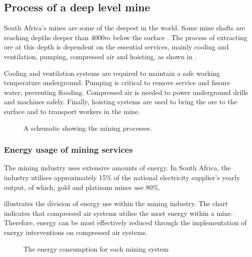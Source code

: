 	\subsection{Process of a deep level mine}
	South Africa's mines are some of the deepest in the world. Some mine shafts are reaching depths deeper than $4000m$ below the surface \cite{vosloo2012case}. The process of extracting ore at this depth is dependent on the essential services, mainly cooling and ventilation, pumping, compressed air and hoisting, as shown in .
	\par 
	 Cooling and ventilation systems are required to maintain a safe working temperature underground. Pumping is critical to remove service and fissure water, preventing flooding. Compressed air is needed to power underground drills and machines safely. Finally, hoisting systems are used to bring the ore to the surface and to transport  workers in the mine. 
		\begin{figure}[h!]
			\centering
			\caption{A schematic showing the mining processes.}
			\label{fig: Mining Layout}
		\end{figure}
		\subsubsection{Energy usage of mining services}
			The mining industry uses extensive amounts of energy. In South Africa, the industry utilises approximately 15\% of the national electricity supplier's yearly output, of which, gold and platinum mines use 80\%.\cite{Eskom2010Energy}
			\par
			  illustrates the division of energy use within the mining industry. The chart indicates that compressed air systems utilise the most energy within a mine. Therefore, energy can be most effectively reduced through the implementation of energy interventions on compressed air systems.
			\begin{figure}[h]
				\centering
				\fbox{}
				\caption[The energy consumption for each mining system]{The energy consumption for each mining system \cite{le2005energy}}
				\label{fig: Energy Split}
			\end{figure}
